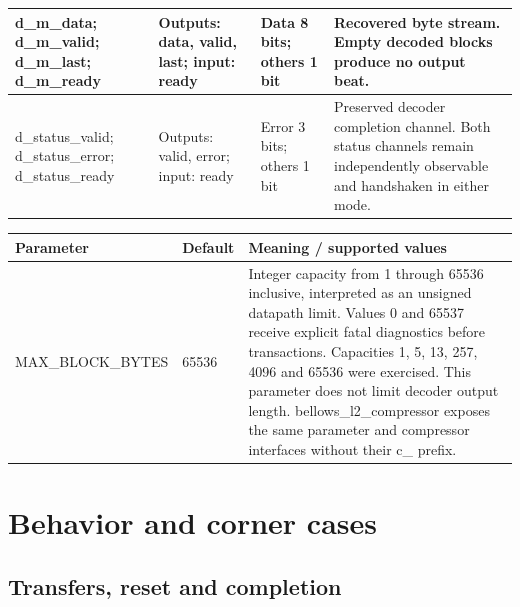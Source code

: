 \documentclass[11pt,a4paper]{article}
\begin{document}
{\begin{longtable}{@{}L{0.21\textwidth}|L{0.12\textwidth}|L{0.12\textwidth}|L{0.45\textwidth}@{}}
d\_\allowbreak{}m\_\allowbreak{}data; d\_\allowbreak{}m\_\allowbreak{}valid; d\_\allowbreak{}m\_\allowbreak{}last; d\_\allowbreak{}m\_\allowbreak{}ready & Outputs: data,\allowbreak{} valid,\allowbreak{} last; input: ready & Data 8 bits; others 1 bit & Recovered byte stream. Empty decoded blocks produce no output beat.\\[2pt]\hline

d\_\allowbreak{}status\_\allowbreak{}valid; d\_\allowbreak{}status\_\allowbreak{}error; d\_\allowbreak{}status\_\allowbreak{}ready & Outputs: valid,\allowbreak{} error; input: ready & Error 3 bits; others 1 bit & Preserved decoder completion channel. Both status channels remain independently observable and handshaken in either mode.\\[2pt]\hline

\bottomrule\end{longtable}}

{\small\renewcommand{\arraystretch}{1.18}\begin{longtable}{@{}L{0.22\textwidth}|L{0.21\textwidth}|L{0.49\textwidth}@{}}\toprule

\textbf{Parameter} & \textbf{Default} & \textbf{Meaning /\allowbreak{} supported values}\\\midrule\endhead

MAX\_\allowbreak{}BLOCK\_\allowbreak{}BYTES & 65536 & Integer capacity from 1 through 65536 inclusive,\allowbreak{} interpreted as an unsigned datapath limit. Values 0 and 65537 receive explicit fatal diagnostics before transactions. Capacities 1,\allowbreak{} 5,\allowbreak{} 13,\allowbreak{} 257,\allowbreak{} 4096 and 65536 were exercised. This parameter does not limit decoder output length. bellows\_\allowbreak{}l2\_\allowbreak{}compressor exposes the same parameter and compressor interfaces without their c\_\allowbreak{} prefix.\\[2pt]\hline

\bottomrule\end{longtable}}

\section{Behavior and corner cases}

\subsection{Transfers,\allowbreak{} reset and completion}
\end{document}

